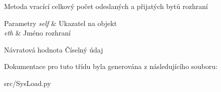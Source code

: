 Metoda vracící celkový počet odeslaných a přijatých bytů rozhraní 


\begin{DoxyParams}{Parametry}
{\em self} & Ukazatel na objekt \\
\hline
{\em eth} & Jméno rozhraní \\
\hline
\end{DoxyParams}
\begin{DoxyReturn}{Návratová hodnota}
Číselný údaj 
\end{DoxyReturn}


Dokumentace pro tuto třídu byla generována z následujícího souboru\-:\begin{DoxyCompactItemize}
\item 
src/Sys\-Load.\-py\end{DoxyCompactItemize}
